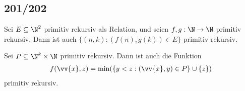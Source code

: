 \subsection*{201/202}
\begin{exercise}[201]

Sei $E \subseteq \N^2$ primitiv rekursiv als Relation, und seien $f,g: \N \to \N$
primitiv rekursiv. Dann ist auch $\{(n,k): (f(n),g(k)) \in E\}$ primitiv rekursiv.

\end{exercise}


\begin{solution}

\phantom{}

\end{solution}

\begin{exercise}[202]

Sei $P \subseteq \N^k \times \N$ primitiv rekursiv. Dann ist auch die Funktion
\begin{align*}
	f(\vv{x},z) = \min(\{y < z: (\vv{x},y) \in P\} \cup \{z\})
\end{align*}
primitiv rekursiv.

\end{exercise}


\begin{solution}

\phantom{}

\end{solution}
